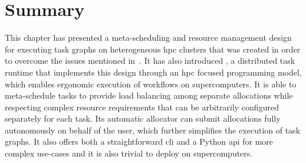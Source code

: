 %

\section*{Summary}
This chapter has presented a meta-scheduling and resource management design for executing task
graphs on heterogeneous \gls{hpc} clusters that was created in order to overcome the
issues mentioned in~. It has also introduced \hyperqueue{}, a
distributed task runtime that implements this design through an \gls{hpc} focused
programming model, which enables ergonomic execution of workflows on supercomputers. It is able to
meta-schedule tasks to provide load balancing among separate allocations while respecting complex
resource requirements that can be arbitrarily configured separately for each task. Its automatic
allocator can submit allocations fully autonomously on behalf of the user, which further simplifies
the execution of \hyperqueue{} task graphs. It also offers both a straightforward
\gls{cli} and a Python \gls{api} for more complex use-cases and it is
also trivial to deploy on supercomputers.

